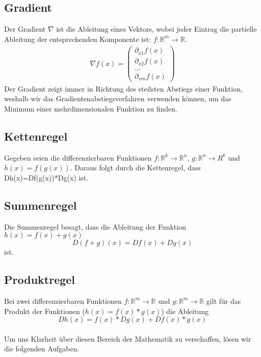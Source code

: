 \subsection{Gradient}
Der Gradient $\nabla$ ist die Ableitung eines Vektors, wobei jeder Eintrag die partielle Ableitung der entsprechenden Komponente ist:
$f:\mathds{R}^m\rightarrow\mathds{R}$.
\begin{equation} \begin{split} \nabla f(x) = \left( \begin{array}{c}
\partial_{x1} f(x) \\
\partial_{x2} f(x) \\
... \\
\partial_{xm} f(x)
\end{array}
\right)
\end{split} \end{equation} 
Der Gradient zeigt immer in Richtung des steilsten Abstiegs einer Funktion, weshalb wir das Gradientenabstiegsverfahren verwenden können, um das Minimum einer mehrdimensionalen Funktion zu finden.
\subsection{Kettenregel}
Gegeben seien die differenzierbaren Funktionen $f:\mathds{R}^k\rightarrow\mathds{R}^n$, $g:\mathds{R}^n\rightarrow{R}^k$ und $h(x)=f(g(x))$. Daraus folgt durch die Kettenregel, dass Dh(x)=Df(g(x))*Dg(x) ist.
\subsection{Summenregel}
Die Summenregel besagt, dass die Ableitung der Funktion $h(x)=f(x)+g(x)$ \begin{equation*} D(f + g)(x)=Df(x)+Dg(x)\end{equation*} ist.
\subsection {Produktregel}
Bei zwei differenzierbaren Funktionen $f:\mathds{R}^m\rightarrow\mathds{R}$ und $g:\mathds{R}^m\rightarrow\mathds{R}$ gilt für das Produkt der Funktionen ($h(x)=f(x)*g(x)$) die Ableitung \begin{equation*}Dh(x)=f(x)*Dg(x)+Df(x)*g(x)\end{equation*}
\\
Um uns Klarheit über diesen Bereich der Mathematik zu verschaffen, l\"osen wir die folgenden Aufgaben.
\vspace{15pt}

